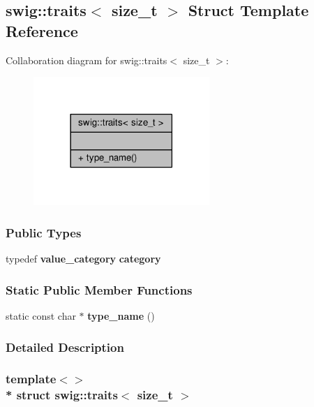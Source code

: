 \subsection{swig\+:\+:traits$<$ size\+\_\+t $>$ Struct Template Reference}
\label{structswig_1_1traits_3_01size__t_01_4}


Collaboration diagram for swig\+:\+:traits$<$ size\+\_\+t $>$\+:
\nopagebreak
\begin{figure}[H]
\begin{center}
\leavevmode
\includegraphics[width=189pt]{db/d25/structswig_1_1traits_3_01size__t_01_4__coll__graph}
\end{center}
\end{figure}
\subsubsection*{Public Types}
\begin{DoxyCompactItemize}
\item 
typedef {\bf value\+\_\+category} {\bf category}
\end{DoxyCompactItemize}
\subsubsection*{Static Public Member Functions}
\begin{DoxyCompactItemize}
\item 
static const char $\ast$ {\bf type\+\_\+name} ()
\end{DoxyCompactItemize}


\subsubsection{Detailed Description}
\subsubsection*{template$<$$>$\\*
struct swig\+::traits$<$ size\+\_\+t $>$}



